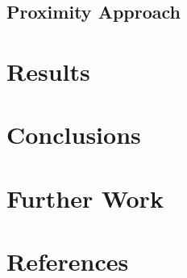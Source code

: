 \documentclass[final,3p,12pt]{elsarticle}
\begin{document}


\subsection{Proximity Approach}
\label{process:proximity}



\section{Results}
\label{results}



\section{Conclusions}
\label{conclusions}


\section{Further Work}
\label{further work}



\section{References}
\label{references}
\nocite{*}


\end{document}

